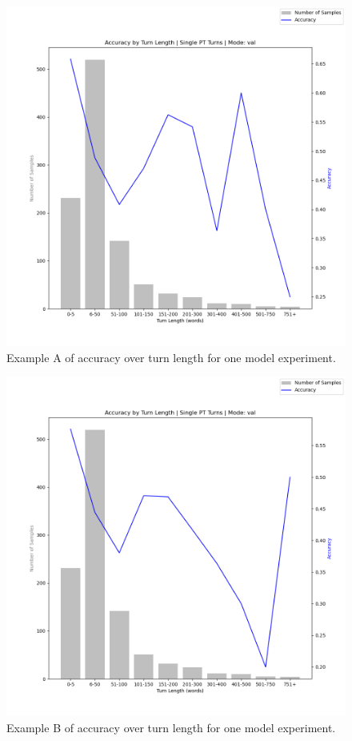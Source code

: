 \documentclass[12pt]{report}
\begin{document}
\begin{figure}
    \includegraphics[width=\textwidth]{figures/accuracy_by_length_2024.03.13_11.54.44_model_7_val.png}
    \caption{Example A of accuracy over turn length for one model experiment.}
    \label{fig: acc over turn len 7}
\end{figure}

\begin{figure}
    \includegraphics[width=\textwidth]{figures/accuracy_by_length_2024.03.14_09.59.35_model_11_val.png}
    \caption{Example B of accuracy over turn length for one model experiment.}
    \label{fig: acc over turn len 11}
\end{figure}
\end{document}
